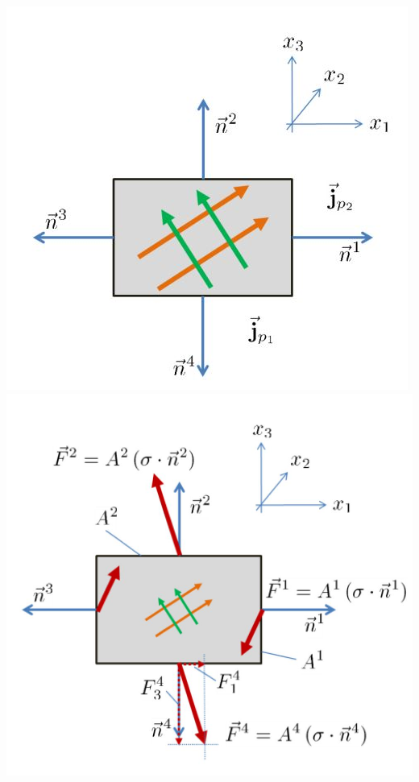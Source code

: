 \newpage



		\includegraphics[scale=.3]{images/3Dmomentum}				
		\includegraphics[scale=.3]{images/3Dcuttingforces}				
